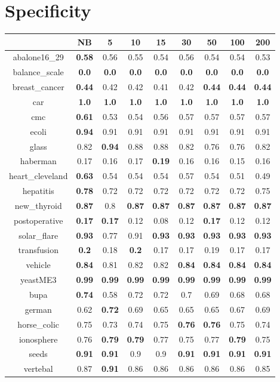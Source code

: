 \documentclass{article}%
\begin{document}
%
\section*{Specificity}%
\begin{tabular}{c|cccccccc}%
\hline%
&NB&5&10&15&30&50&100&200\\%
\hline%
abalone16\_29&\textbf{0.58}&0.56&0.55&0.54&0.56&0.54&0.54&0.53\\%
\hline%
balance\_scale&\textbf{0.0}&\textbf{0.0}&\textbf{0.0}&\textbf{0.0}&\textbf{0.0}&\textbf{0.0}&\textbf{0.0}&\textbf{0.0}\\%
\hline%
breast\_cancer&\textbf{0.44}&0.42&0.42&0.41&0.42&\textbf{0.44}&\textbf{0.44}&\textbf{0.44}\\%
\hline%
car&\textbf{1.0}&\textbf{1.0}&\textbf{1.0}&\textbf{1.0}&\textbf{1.0}&\textbf{1.0}&\textbf{1.0}&\textbf{1.0}\\%
\hline%
cmc&\textbf{0.61}&0.53&0.54&0.56&0.57&0.57&0.57&0.57\\%
\hline%
ecoli&\textbf{0.94}&0.91&0.91&0.91&0.91&0.91&0.91&0.91\\%
\hline%
glass&0.82&\textbf{0.94}&0.88&0.88&0.82&0.76&0.76&0.82\\%
\hline%
haberman&0.17&0.16&0.17&\textbf{0.19}&0.16&0.16&0.15&0.16\\%
\hline%
heart\_cleveland&\textbf{0.63}&0.54&0.54&0.54&0.57&0.54&0.51&0.49\\%
\hline%
hepatitis&\textbf{0.78}&0.72&0.72&0.72&0.72&0.72&0.72&0.75\\%
\hline%
new\_thyroid&\textbf{0.87}&0.8&\textbf{0.87}&\textbf{0.87}&\textbf{0.87}&\textbf{0.87}&\textbf{0.87}&\textbf{0.87}\\%
\hline%
postoperative&\textbf{0.17}&\textbf{0.17}&0.12&0.08&0.12&\textbf{0.17}&0.12&0.12\\%
\hline%
solar\_flare&\textbf{0.93}&0.77&0.91&\textbf{0.93}&\textbf{0.93}&\textbf{0.93}&\textbf{0.93}&\textbf{0.93}\\%
\hline%
transfusion&\textbf{0.2}&0.18&\textbf{0.2}&0.17&0.17&0.19&0.17&0.17\\%
\hline%
vehicle&\textbf{0.84}&0.81&0.82&0.82&\textbf{0.84}&\textbf{0.84}&\textbf{0.84}&\textbf{0.84}\\%
\hline%
yeastME3&\textbf{0.99}&\textbf{0.99}&\textbf{0.99}&\textbf{0.99}&\textbf{0.99}&\textbf{0.99}&\textbf{0.99}&\textbf{0.99}\\%
\hline%
bupa&\textbf{0.74}&0.58&0.72&0.72&0.7&0.69&0.68&0.68\\%
\hline%
german&0.62&\textbf{0.72}&0.69&0.65&0.65&0.65&0.67&0.69\\%
\hline%
horse\_colic&0.75&0.73&0.74&0.75&\textbf{0.76}&\textbf{0.76}&0.75&0.74\\%
\hline%
ionosphere&0.76&\textbf{0.79}&\textbf{0.79}&0.77&0.75&0.77&\textbf{0.79}&0.75\\%
\hline%
seeds&\textbf{0.91}&\textbf{0.91}&0.9&0.9&\textbf{0.91}&\textbf{0.91}&\textbf{0.91}&\textbf{0.91}\\%
\hline%
vertebal&0.87&\textbf{0.91}&0.86&0.86&0.86&0.86&0.86&0.85\\%
\hline%
\end{tabular}
\end{document}
